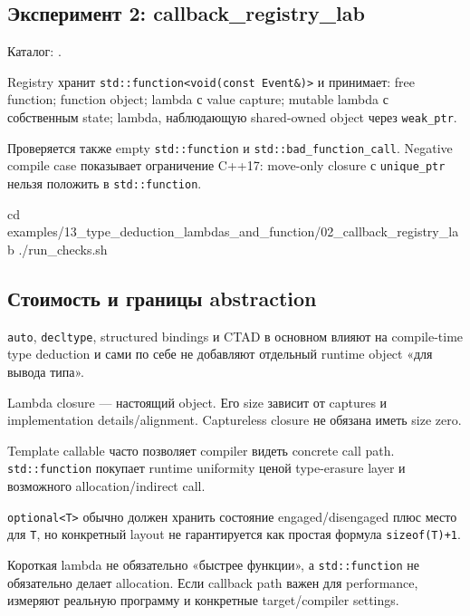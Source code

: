 \subsection{Эксперимент 2: callback\_registry\_lab}

Каталог:
.

Registry хранит \texttt{std::function<void(const Event\&)>} и принимает:
free function; function object; lambda с value capture; mutable lambda с собственным state; lambda, наблюдающую shared-owned object через \texttt{weak\_ptr}.

Проверяется также empty \texttt{std::function} и
\texttt{std::bad\_function\_call}. Negative compile case показывает ограничение
C++17: move-only closure с \texttt{unique\_ptr} нельзя положить в
\texttt{std::function}.

\begin{shellcode}
cd examples/13_type_deduction_lambdas_and_function/02_callback_registry_lab
./run_checks.sh
\end{shellcode}

\subsection{Стоимость и границы abstraction}

\texttt{auto}, \texttt{decltype}, structured bindings и CTAD в основном влияют
на compile-time type deduction и сами по себе не добавляют отдельный runtime
object «для вывода типа».

Lambda closure --- настоящий object. Его size зависит от captures и
implementation details/alignment. Captureless closure не обязана иметь size
zero.

Template callable часто позволяет compiler видеть concrete call path.
\texttt{std::function} покупает runtime uniformity ценой type-erasure layer и
возможного allocation/indirect call.

\texttt{optional<T>} обычно должен хранить состояние engaged/disengaged плюс
место для \texttt{T}, но конкретный layout не гарантируется как простая формула
\texttt{sizeof(T)+1}.

\begin{performancebox}
Короткая lambda не обязательно «быстрее функции», а \texttt{std::function} не
обязательно делает allocation. Если callback path важен для performance,
измеряют реальную программу и конкретные target/compiler settings.
\end{performancebox}

